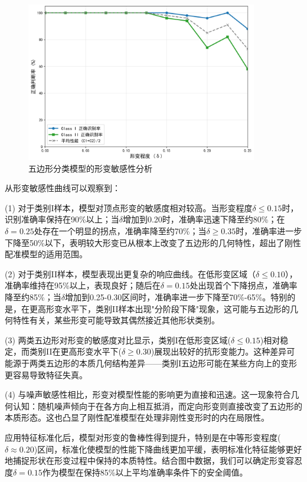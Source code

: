 \begin{figure}[H]
    \centering
    \includegraphics[width=0.9\textwidth]{figures/robustness/pentagon_robustness_deformation_vertex.png}
    \caption{五边形分类模型的形变敏感性分析}
    \label{fig:deform_analysis}
\end{figure}

从形变敏感性曲线可以观察到：

(1) 对于类别I样本，模型对顶点形变的敏感度相对较高。当形变程度$\delta \leq 0.15$时，识别准确率保持在90\%以上；当$\delta$增加到0.20时，准确率迅速下降至约80\%；在$\delta = 0.25$处存在一个明显的拐点，准确率降至约70\%；当$\delta \geq 0.35$时，准确率进一步下降至50\%以下，表明较大形变已从根本上改变了五边形的几何特性，超出了刚性配准模型的适用范围。

(2) 对于类别II样本，模型表现出更复杂的响应曲线。在低形变区域（$\delta \leq 0.10$），准确率维持在95\%以上，表现良好；随后在$\delta = 0.15$处出现首个下降拐点，准确率降至约85\%；当$\delta$增加到0.25-0.30区间时，准确率进一步下降至70\%-65\%。特别的是，在更高形变水平下，类别II样本出现"分阶段下降"现象，这可能与五边形的几何特性有关，某些形变可能导致其偶然接近其他形状类别。

(3) 两类五边形对形变的敏感度对比显示，类别I在低形变区域($\delta \leq 0.15$)相对稳定，而类别II在更高形变水平下($\delta \geq 0.30$)展现出较好的抗形变能力。这种差异可能源于两类五边形的本质几何结构差异——类别I五边形可能在某些方向上的变形更容易导致特征失真。

(4) 与噪声敏感性相比，形变对模型性能的影响更为直接和迅速。这一现象符合几何认知：随机噪声倾向于在各方向上相互抵消，而定向形变则直接改变了五边形的本质形态。这也凸显了刚性配准模型在处理非刚性变形时的内在局限性。

应用特征标准化后，模型对形变的鲁棒性得到提升，特别是在中等形变程度($\delta \approx 0.20$)区间，标准化使模型的性能下降曲线更加平缓，表明标准化特征能够更好地捕捉形状在形变过程中保持的本质特性。结合图中数据，我们可以确定形变容忍度$\delta = 0.15$作为模型在保持85\%以上平均准确率条件下的安全阈值。

